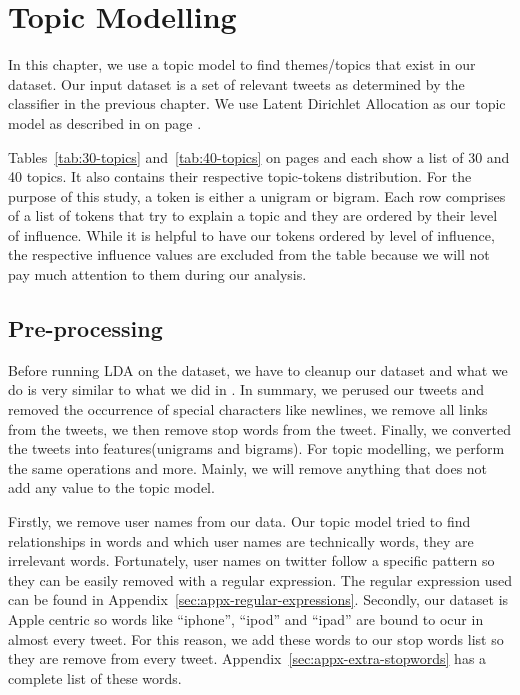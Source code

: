 \chapter{Topic Modelling}
\label{cha:topic-modelling}
In this chapter, we use a topic model to find themes/topics that exist in our dataset. Our input
dataset is a set of relevant tweets as determined by the classifier in the previous chapter. We use
Latent Dirichlet Allocation as our topic model as described in  on page
\pageref{sec:bg-lda}.

Tables~\ref{tab:30-topics} and~\ref{tab:40-topics} on pages \pageref{tab:30-topics} and
\pageref{tab:40-topics} each show a list of 30 and 40 topics. It also contains their respective
topic-tokens distribution. For the purpose of this study, a token is either a unigram or bigram.
Each row comprises of a list of tokens that try to explain a topic and they are ordered by their
level of influence. While it is helpful to have our tokens ordered by level of influence, the
respective influence values are excluded from the table because we will not pay much
attention to them during our analysis.


\section{Pre-processing}
\label{sec:lda-preprocessing}
Before running LDA on the dataset, we have to cleanup our dataset and what we do is very similar to
what we did in . In summary, we perused our tweets
and removed the occurrence of special characters like newlines, we remove all links from the tweets,
we then remove stop words from the tweet. Finally, we converted the tweets into features(unigrams
and bigrams). For topic modelling, we perform the same operations and more. Mainly, we will remove
anything that does not add any value to the topic model.

Firstly, we remove user names from our data. Our topic model tried to find relationships in words
and which user names are technically words, they are irrelevant words. Fortunately, user names on
twitter follow a specific pattern so they can be easily removed with a regular expression. The
regular expression used can be found in Appendix~\ref{sec:appx-regular-expressions}. Secondly, our
dataset is Apple centric so words like ``iphone'', ``ipod'' and ``ipad'' are bound to ocur in almost
every tweet. For this reason, we add these words to our stop words list so they are remove from
every tweet. Appendix~\ref{sec:appx-extra-stopwords} has a complete list of these words.


